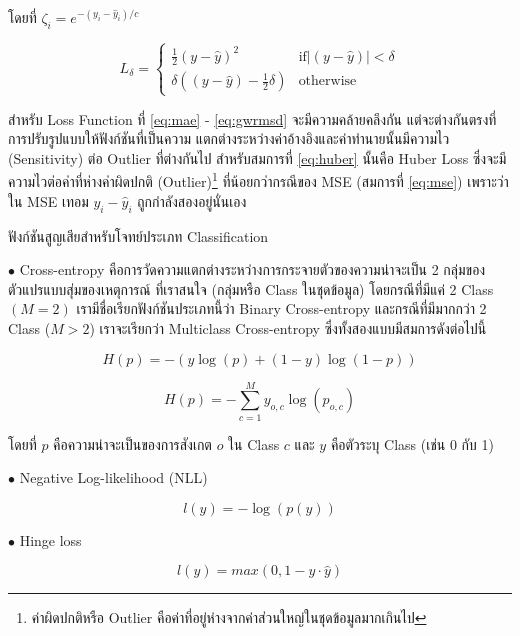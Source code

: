 \noindent โดยที่ $\zeta_{i} = e^{-(y_{i} - \hat{y}_{i}) / c}$

\begin{equation}\label{eq:huber}
    L_{\delta}=
    \left\{\begin{matrix}
        \frac{1}{2}(y - \hat{y})^{2} & \text{if} \left | (y - \hat{y})  \right | < \delta\\
        \delta ((y - \hat{y}) - \frac1 2 \delta) & \text{otherwise}
    \end{matrix}\right.
\end{equation}

สำหรับ Loss Function ที่ \ref{eq:mae} - \ref{eq:gwrmsd} จะมีความคล้ายคลึงกัน แต่จะต่างกันตรงที่การปรับรูปแบบให้ฟังก์ชันที่เป็นความ%
แตกต่างระหว่างค่าอ้างอิงและค่าทำนายนั้นมีความไว (Sensitivity) ต่อ Outlier ที่ต่างกันไป สำหรับสมการที่ \ref{eq:huber} นั้นคือ Huber
Loss ซึ่งจะมีความไวต่อค่าที่ห่างค่าผิดปกติ (Outlier)\footnote{ค่าผิดปกติหรือ Outlier คือค่าที่อยู่ห่างจากค่าส่วนใหญ่ในชุดข้อมูลมากเกินไป} 
ที่น้อยกว่ากรณีของ MSE (สมการที่ \ref{eq:mse}) เพราะว่าใน MSE เทอม $y_{i} - \hat{y}_{i}$ ถูกกำลังสองอยู่นั่นเอง

ฟังก์ชันสูญเสียสำหรับโจทย์ประเภท Classification

\noindent $\bullet$ Cross-entropy คือการวัดความแตกต่างระหว่างการกระจายตัวของความน่าจะเป็น 2 กลุ่มของตัวแปรแบบสุ่มของเหตุการณ์%
ที่เราสนใจ (กลุ่มหรือ Class ในชุดข้อมูล) โดยกรณีที่มีแค่ 2 Class $(M = 2)$ เรามีชื่อเรียกฟังก์ชันประเภทนี้ว่า Binary Cross-entropy 
และกรณีที่มีมากกว่า 2 Class ($M > 2$) เราจะเรียกว่า Multiclass Cross-entropy ซึ่งทั้งสองแบบมีสมการดังต่อไปนี้

\begin{equation}
    H(p) = -{(y\log(p) + (1 - y)\log(1 - p))}
\end{equation}

\begin{equation}
    H(p) = -\sum_{c=1}^My_{o,c}\log(p_{o,c})
\end{equation}


\noindent โดยที่ $p$ คือความน่าจะเป็นของการสังเกต $o$ ใน Class $c$ และ $y$ คือตัวระบุ Class (เช่น 0 กับ 1)

\noindent $\bullet$ Negative Log-likelihood (NLL)

\begin{equation}
    l(y) = -{\log(p(y))}
\end{equation}

\noindent $\bullet$ Hinge loss

\begin{equation}
    l(y) = max(0, 1 - y \cdot \hat{y})
\end{equation}

